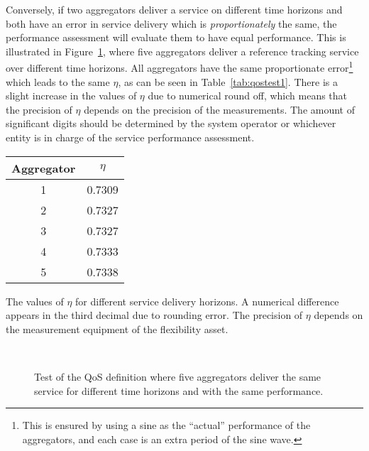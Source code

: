 Conversely, if two aggregators deliver a service on different time horizons and both have an error in service delivery which is \emph{proportionately} the same, the performance assessment will evaluate them to have equal performance. This is illustrated in Figure~\ref{fig:indextest1}, where five aggregators deliver a reference tracking service over different time horizons. All aggregators have the same proportionate error\footnote{This is ensured by using a sine as the ``actual'' performance of the aggregators, and each case is an extra period of the sine wave.} which leads to the same $\eta$, as can be seen in Table~\ref{tab:qostest1}. There is a slight increase in the values of $\eta$ due to numerical round off, which means that the precision of $\eta$ depends on the precision of the measurements. The amount of significant digits should be determined by the system operator or whichever entity is in charge of the service performance assessment.
\begin{margintable}[15\baselineskip]%
	\centering
	\begin{tabular}{cc}
		\toprule
		Aggregator & $\eta$ \\
		\midrule
		1 & 0.7309 \\
		2 & 0.7327  \\
		3 & 0.7327  \\
		4 & 0.7333  \\
		5 & 0.7338 \\
		\bottomrule
	\end{tabular}
	\caption{The values of $\eta$ for different service delivery horizons. A numerical difference appears in the third decimal due to rounding error. The precision of $\eta$ depends on the measurement equipment of the flexibility asset.}
	\label{tab:qostest1}
\end{margintable}
\begin{figure}
\centering
{} \\
\caption{Test of the QoS definition where five aggregators deliver the same service for different time horizons and with the same performance.}
\label{fig:indextest1}
\end{figure}

